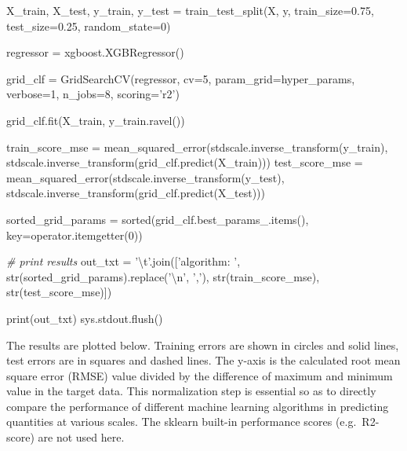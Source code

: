 \documentclass[11pt]{article}
\newenvironment{Shaded}{}{}
\newcommand{\DecValTok}[1]{\textcolor[rgb]{0.25,0.63,0.44}{{#1}}}
\newcommand{\FloatTok}[1]{\textcolor[rgb]{0.25,0.63,0.44}{{#1}}}
\newcommand{\CharTok}[1]{\textcolor[rgb]{0.25,0.44,0.63}{{#1}}}
\newcommand{\StringTok}[1]{\textcolor[rgb]{0.25,0.44,0.63}{{#1}}}
\newcommand{\CommentTok}[1]{\textcolor[rgb]{0.38,0.63,0.69}{\textit{{#1}}}}
\newcommand{\NormalTok}[1]{{#1}}
\newcommand{\OperatorTok}[1]{\textcolor[rgb]{0.40,0.40,0.40}{{#1}}}
\newcommand{\BuiltInTok}[1]{{#1}}
\begin{document}
\begin{Shaded}
\begin{Highlighting}[]
\NormalTok{    X_train, X_test, y_train, y_test }\OperatorTok{=}\NormalTok{ train_test_split(X, y, train_size}\OperatorTok{=}\FloatTok{0.75}\NormalTok{, }
\NormalTok{                                                        test_size}\OperatorTok{=}\FloatTok{0.25}\NormalTok{, random_state}\OperatorTok{=}\DecValTok{0}\NormalTok{)}
    
\NormalTok{    regressor }\OperatorTok{=}\NormalTok{ xgboost.XGBRegressor()}

\NormalTok{    grid_clf }\OperatorTok{=}\NormalTok{ GridSearchCV(regressor, cv}\OperatorTok{=}\DecValTok{5}\NormalTok{, param_grid}\OperatorTok{=}\NormalTok{hyper_params,}
\NormalTok{                            verbose}\OperatorTok{=}\DecValTok{1}\NormalTok{, n_jobs}\OperatorTok{=}\DecValTok{8}\NormalTok{, scoring}\OperatorTok{=}\StringTok{'r2'}\NormalTok{)}

\NormalTok{    grid_clf.fit(X_train, y_train.ravel())}

\NormalTok{    train_score_mse }\OperatorTok{=}\NormalTok{ mean_squared_error(stdscale.inverse_transform(y_train),}
\NormalTok{                                         stdscale.inverse_transform(grid_clf.predict(X_train)))}
\NormalTok{    test_score_mse }\OperatorTok{=}\NormalTok{ mean_squared_error(stdscale.inverse_transform(y_test),}
\NormalTok{                                        stdscale.inverse_transform(grid_clf.predict(X_test)))}

\NormalTok{    sorted_grid_params }\OperatorTok{=} \BuiltInTok{sorted}\NormalTok{(grid_clf.best_params_.items(), key}\OperatorTok{=}\NormalTok{operator.itemgetter(}\DecValTok{0}\NormalTok{))}

    \CommentTok{# print results}
\NormalTok{    out_txt }\OperatorTok{=} \StringTok{'}\CharTok{\textbackslash{}t}\StringTok{'}\NormalTok{.join([}\StringTok{'algorithm: '}\NormalTok{, }\BuiltInTok{str}\NormalTok{(sorted_grid_params).replace(}\StringTok{'}\CharTok{\textbackslash{}n}\StringTok{'}\NormalTok{, }\StringTok{','}\NormalTok{), }
                         \BuiltInTok{str}\NormalTok{(train_score_mse), }\BuiltInTok{str}\NormalTok{(test_score_mse)])}

    \BuiltInTok{print}\NormalTok{(out_txt)}
\NormalTok{    sys.stdout.flush()}
\end{Highlighting}
\end{Shaded}

    The results are plotted below. Training errors are shown in circles and
solid lines, test errors are in squares and dashed lines. The y-axis is
the calculated root mean square error (RMSE) value divided by the
difference of maximum and minimum value in the target data. This
normalization step is essential so as to directly compare the
performance of different machine learning algorithms in predicting
quantities at various scales. The sklearn built-in performance scores
(e.g.~R2-score) are not used here.
\end{document}
